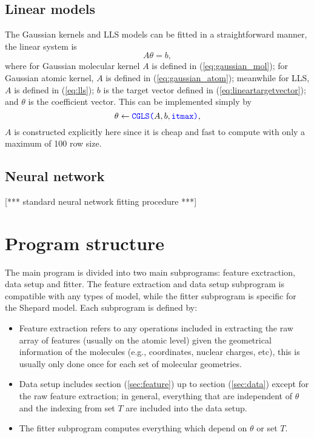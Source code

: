 \documentclass[12pt]{article}
\def\att{                    %
        \marginpar[ \hspace*{\fill} \raisebox{-0.2em}{\rule{2mm}{1.2em}} ]
        {\raisebox{-0.2em}{\rule{2mm}{1.2em}} }
        }
\def\at#1{[*** \att #1 ***]}  %
\begin{document}
\subsection{Linear models}
The Gaussian kernels and LLS models can be fitted in a straightforward manner, the linear system is
\begin{equation}
	A \theta = b,
\end{equation}
where for Gaussian molecular kernel $A$ is defined in (\ref{eq:gaussian_mol}); for Gaussian atomic kernel, $A$ is defined in (\ref{eq:gaussian_atom}); meanwhile for LLS, $A$ is defined in (\ref{eq:lls}); $b$ is the target vector defined in (\ref{eq:lineartargetvector}); and $\theta$ is the coefficient vector. This can be implemented simply by
\begin{equation*}
	\theta \leftarrow \codeword{CGLS(}A, b,\codeword{itmax)},
\end{equation*}
$A$ is constructed explicitly here since it is cheap and fast to compute with only a maximum of 100 row size.

\subsection{Neural network}
\at{standard neural network fitting procedure}


\section{Program structure}
The main program is divided into two main subprograms: feature exctraction, data setup and fitter. The feature extraction and data setup subprogram is compatible with any types of model, while the fitter subprogram is specific for the Shepard model. Each subprogram is defined by:
\begin{itemize}
	\item Feature extraction refers to any operations included in extracting the raw array of features (usually on the atomic level) given the geometrical information of the molecules (e.g., coordinates, nuclear charges, etc), this is usually only done once for each set of molecular geometries.
	\item Data setup includes section (\ref{sec:feature}) up to section (\ref{sec:data}) except for the raw feature extraction; in general, everything that are independent of $\theta$ and the indexing from set $T$ are included into the data setup. 
	\item The fitter subprogram computes everything which depend on $\theta$ or set $T$. 
\end{itemize}
\end{document}
